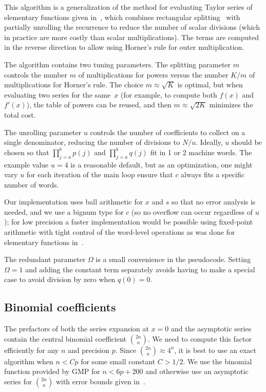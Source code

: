 \documentclass[11pt,a4paper]{article}
\begin{document}
This algorithm is a generalization of the
method for evaluating Taylor series of elementary
functions given in~\cite{Johansson2015elementary},
which combines rectangular splitting~\cite{Smith1989}
with partially unrolling the recurrence to reduce the number of scalar divisions
(which in practice are more costly than scalar multiplications).
The terms are computed in the reverse direction to allow
using Horner's rule for outer
multiplication.

The algorithm contains two tuning parameters.
The splitting parameter $m$ controls the
number $m$ of multiplications for powers versus the number $K / m$ of
multiplications for Horner's rule.
The choice $m \approx \sqrt K$ is optimal,
but when evaluating two series for the same~$x$
(for example, to compute both $f(x)$ and $f'(x)$), the table of powers can be reused,
and then $m \approx \sqrt{2K}$ minimizes the total cost.

The unrolling parameter $u$ controls the number of coefficients
to collect on a single denominator, reducing the
number of divisions to $N / u$.
Ideally, $u$ should be chosen
so that $\prod_{j=a}^b p(j)$
and $\prod_{j=a}^b q(j)$ fit in 1 or 2 machine words.
The example value $u = 4$ is a reasonable
default, but as an optimization, one might vary $u$
for each iteration of the main loop
ensure that $c$ always fits a specific number of words.

Our implementation uses ball arithmetic for $x$ and $s$
so that no error analysis is needed, and we use a bignum type for $c$ (so
no overflow can occur regardless of $u$);
for low precision a faster implementation
would be possible using fixed-point arithmetic with tight
control of the word-level operations
as was done for elementary functions in~\cite{Johansson2015elementary}.

The redundant parameter $\Omega$ is a small convenience in the pseudocode.
Setting $\Omega = 1$ and adding the constant term separately
avoids having to make a special case to avoid division by zero when $q(0) = 0$.

\subsection{Binomial coefficients}

The prefactors of both the series expansion at $x = 0$ and the asymptotic series
contain the central binomial coefficient ${2n \choose n}$.
We need to compute this factor efficiently for any $n$ and precision $p$.
Since ${2n \choose n} \approx 4^n$, it is best to use
an exact algorithm when $n < Cp$ for some small constant $C > 1/2$.
We use the binomial function provided by GMP for $n < 6p + 200$
and otherwise use an asymptotic series for ${2n \choose n}$
with error bounds given in~\cite{brent2016asymptotic}.
\end{document}
